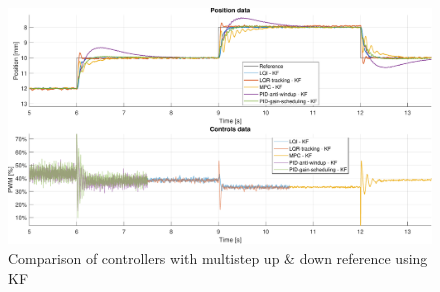 \begin{figure}[H]
    \centering
    \includegraphics[width=1\linewidth]{./img/MATLAB/results/multisteps_updown_star_KF.pdf}
    \caption{Comparison of controllers with multistep up \& down reference using KF}
\end{figure}

